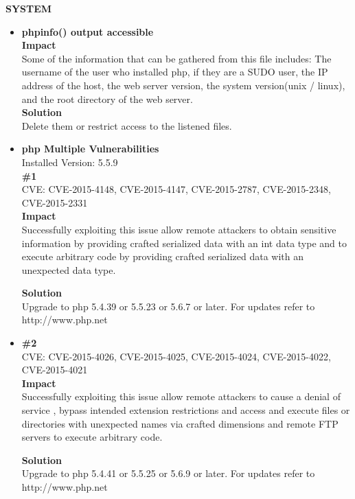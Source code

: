 \begin{center}
\textbf{SYSTEM}
\end{center}

\begin{itemize}
\item \textbf{phpinfo() output accessible}\\

\textbf{Impact}\\
Some of the information that can be gathered from this file includes: The username of the user who installed php, if they are a SUDO user, the IP address of the host, the web server version, the system version(unix / linux), and the root directory of the web server.\\

\textbf{Solution}\\
Delete them or restrict access to the listened files.\\

\item \textbf{php Multiple Vulnerabilities} \\
Installed Version: 5.5.9\\

\textbf{\#1}\\
CVE: CVE-2015-4148, CVE-2015-4147, CVE-2015-2787, CVE-2015-2348, CVE-2015-2331\\
\textbf{Impact} \\
Successfully exploiting this issue allow remote attackers to obtain sensitive information by providing crafted serialized data with an int data type and to execute arbitrary code by providing crafted serialized data with an unexpected data type.

\textbf{Solution}\\
Upgrade to php 5.4.39 or 5.5.23 or 5.6.7 or later. For updates refer to http://www.php.net

\item \textbf{\#2} \\
CVE: CVE-2015-4026, CVE-2015-4025, CVE-2015-4024, CVE-2015-4022, CVE-2015-4021\\

\textbf{Impact} \\
Successfully exploiting this issue allow remote attackers to cause a denial of service , bypass intended extension restrictions and access and execute files or directories with unexpected names via crafted dimensions and remote FTP servers to execute arbitrary code.

\textbf{Solution}\\
Upgrade to php 5.4.41 or 5.5.25 or 5.6.9 or later. For updates refer to http://www.php.net


\end{itemize}

